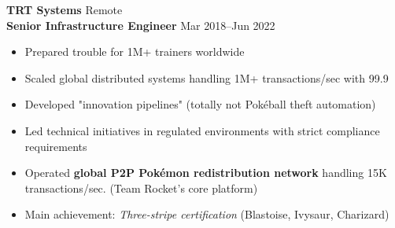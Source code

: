 \textbf{TRT Systems} \hfill Remote \\
\textbf{Senior Infrastructure Engineer} \hfill Mar 2018--Jun 2022
\begin{itemize}
  \item Prepared trouble for 1M+ trainers worldwide
  \item Scaled global distributed systems handling 1M+ transactions/sec with 99.9%
  \ifpublic \item Developed "innovation pipelines" (totally not Pokéball theft automation)
            \item Led technical initiatives in regulated environments with strict compliance requirements
  \else \item Operated \textbf{global P2P Pokémon redistribution network} handling 15K transactions/sec. (Team Rocket's core platform) \fi
  \item Main achievement: \textit{Three-stripe certification} (Blastoise, Ivysaur, Charizard)
\end{itemize}